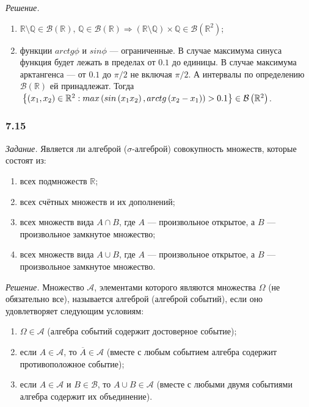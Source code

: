 \textit{Решение.}
\begin{enumerate}[label=\alph*)]
\item $ \mathbb{R} \setminus \mathbb{Q} \in \mathcal{B} \left( \mathbb{R} \right), \,
\mathbb{Q} \in \mathcal{B} \left( \mathbb{R} \right) \Rightarrow
\left( \mathbb{R} \setminus \mathbb{Q} \right) \times \mathbb{Q} \in \mathcal{B} \left( \mathbb{R}^2 \right) $;
\item функции $arctg \phi $ и $sin \phi $ --- ограниченные.
В случае максимума синуса функция будет лежать в пределах от $0.1$ до единицы.
В случае максимума арктангенса --- от $0.1$ до $ \pi/2$ не включая $ \pi/2$.
А интервалы по определению $ \mathcal{B} \left( \mathbb{R} \right) $ ей принадлежат.
Тогда $ \\
\left\{ \left( x_1, x_2 \right) \in \mathbb{R}^2:
max \left( sin \left( x_1 x_2 \right), arctg \left( x_2 - x_1 \right) \right) > 0.1 \right\} \in \mathcal{B} \left( \mathbb{R}^2 \right) $.
\end{enumerate}

\subsubsection*{7.15}

\textit{Задание.} Является ли алгеброй ($ \sigma $-алгеброй) совокупность множеств, которые состоят из:
\begin{enumerate}[label=\alph*)]
\item всех подмножеств $ \mathbb{R} $;
\item всех счётных множеств и их дополнений;
\item всех множеств вида $A \cap B$, где $A$ --- произвольное открытое, а $B$ --- произвольное замкнутое множество;
\item всех множеств вида $A \cup B$, где $A$ --- произвольное открытое, а $B$ --- произвольное замкнутое множество.
\end{enumerate}

\textit{Решение.} Множество $ \mathcal{A} $, элементами которого являются множества $ \Omega $ (не обязательно все), называется алгеброй (алгеброй событий), если оно удовлетворяет следующим условиям:
\begin{enumerate}
\item $ \Omega \in \mathcal{A} $ (алгебра событий содержит достоверное событие);
\item если $A \in \mathcal{A} $, то $ \overline{A} \in \mathcal{A} $ (вместе с любым событием алгебра содержит противоположное событие);
\item если $A \in \mathcal{A} $ и $B \in \mathcal{B} $, то $A \cup B \in \mathcal{A} $
(вместе с любыми двумя событиями алгебра содержит их объединение).
\end{enumerate}

